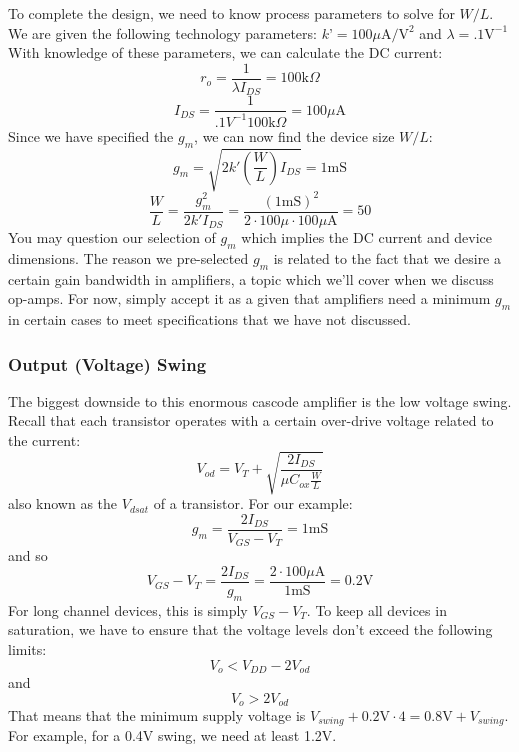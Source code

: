 To complete the design, we need to know process parameters to solve for $W/L$.  We are given the following technology parameters: $k’ = 100 \mu\mathrm{A/V^2}$ and $\lambda = .1\mathrm{V^{-1}}$
With knowledge of these parameters, we can calculate the DC current: 
\begin{equation} 
	{r_o} = \frac{1}{{\lambda {I_{DS}}}} = 100\mathrm{k}\Omega 
\end{equation}
\begin{equation} 
	{I_{DS}} = \frac{1}{{.1{V^{ - 1}} 100\mathrm{k}\Omega }} = 100\mu \mathrm{A}
\end{equation}
Since we have specified the $g_m$, we can now find the device size $W/L$:
\begin{equation} 
	{g_m} = \sqrt {2k'\left( {\frac{W}{L}} \right){I_{DS}}}  = 1\mathrm{mS} 
\end{equation}
\begin{equation} 
	\frac{W}{L} = \frac{{g_m^2}}{{2k'{I_{DS}}}} = \frac{{{{(1\mathrm{mS})}^2}}}{{2 \cdot 100\mu \cdot 100\mu \mathrm{A}}} = 50 
\end{equation}
You may question our selection of $g_m$ which implies the DC current and device dimensions.  The reason we pre-selected $g_m$ is related to the fact that we desire a certain gain bandwidth in amplifiers, a topic which we'll cover when we discuss op-amps.  For now, simply accept it as a given that amplifiers need a minimum $g_m$ in certain cases to meet specifications that we have not discussed.
\subsubsection{Output (Voltage) Swing}

The biggest downside to this enormous cascode amplifier is the low voltage swing.  Recall that each transistor operates with a certain over-drive voltage related to the current:
\begin{equation}
	V_{od} = V_T + \sqrt{\frac{2 I_{DS}}{\mu C_{ox} \frac{W}{L}}} 
\end{equation}
also known as the $V_{dsat}$ of a transistor.  For our example:
\begin{equation} 
	{g_m} = \frac{{2{I_{DS}}}}{{{V_{GS}} - {V_T}}} = 1\mathrm{mS} 
\end{equation}
and so
\begin{equation} 
	{V_{GS}} - {V_T} = \frac{{2{I_{DS}}}}{{{g_m}}} 
           = \frac{{2 \cdot100\mu \mathrm{A}}}{{1\mathrm{mS}}} = 0.2\mathrm{V} 
\end{equation}
For long channel devices, this is simply $V_{GS} - V_T$.  To keep all devices in saturation, we have to ensure that the voltage levels don't exceed the following limits:
\begin{equation}
	V_{o} < V_{DD} - 2 V_{od}
\end{equation} 
and
\begin{equation}
	V_{o} >  2 V_{od}
\end{equation} 
That means that the minimum supply voltage is $V_{swing} + 0.2\mathrm{V} \cdot 4 = 0.8\mathrm{V} + V_{swing}$.  For example, for a 0.4V swing, we need at least 1.2V.  

